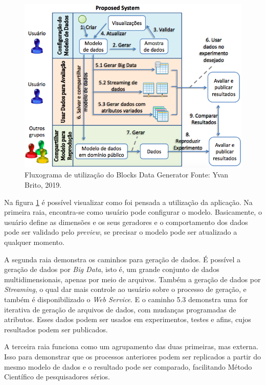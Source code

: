 \documentclass[
	12pt,				%
	openright,			%
	twoside,			%
	a4paper,			%
	english,			%
	brazil				%
	]{abntex2}
\begin{document}
	\begin{figure}[h]
		\centering
		\includegraphics[width=\linewidth]{./figures/prototipo/fluxogramaUtilizacaoBlocks.png}
		\caption{Fluxograma de utilização do Blocks Data Generator Fonte: Yvan Brito, 2019.}
		\label{fig:fluxograma}
	\end{figure}
	\par
	Na figura \ref{fig:fluxograma} é possível visualizar como foi pensada a utilização da aplicação.
	Na primeira raia, encontra-se como usuário pode configurar o modelo.
	Basicamente, o usuário define as dimensões e os seus geradores e o comportamento dos dados pode ser validado pelo \emph{preview}, se precisar o modelo pode ser atualizado a qualquer momento.
	\par
	A segunda raia demonstra os caminhos para geração de dados.
	É possível a geração de dados por \emph{Big Data}, isto é, um grande conjunto de dados multidimensionais, apenas por meio de arquivos.
	Também a geração de dados por \emph{Streaming}, o qual dar mais controle ao usuário sobre o processo de geração, e também é disponibilizado o \emph{Web Service}.
	E o caminho 5.3 demonstra uma for iterativa de geração de arquivos de dados, com mudanças programadas de atributos.
	Esses dados podem ser usados em experimentos, testes e afins, cujos resultados podem ser publicados.
	\par
	A terceira raia funciona como um agrupamento das duas primeiras, mas externa.
	Isso para demonstrar que os processos anteriores podem ser replicados a partir do mesmo modelo de dados e o resultado pode ser comparado, facilitando Método Científico de pesquisadores sérios.
	
\end{document}
